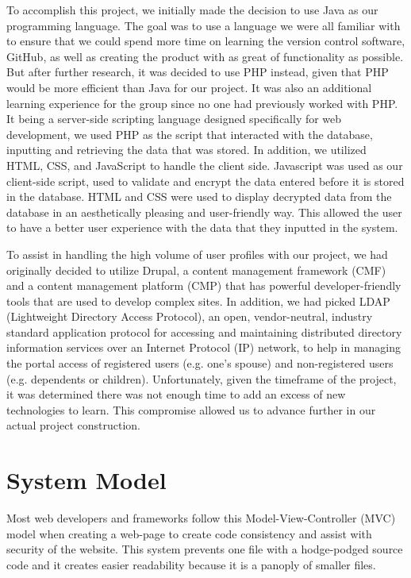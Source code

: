 \documentclass[twocolumn,12pt]{article}
\begin{document}
To accomplish this project, we initially made the decision to use Java as our programming language. The goal was to use a language we were all familiar with to ensure that we could spend more time on learning the version control software, GitHub, as well as creating the product with as great of functionality as possible. But after further research, it was decided to use PHP instead, given that PHP would be more efficient than Java for our project. It was also an additional learning experience for the group since no one had previously worked with PHP. It being a server-side scripting language designed specifically for web development, we used PHP as the script that interacted with the database, inputting and retrieving the data that was stored. In addition, we utilized HTML, CSS, and JavaScript to handle the client side. Javascript was used as our client-side script, used to validate and encrypt the data entered before it is stored in the database. HTML and CSS were used to display decrypted data from the database in an aesthetically pleasing and user-friendly way. This allowed the user to have a better user experience with the data that they inputted in the system.

To assist in handling the high volume of user profiles with our project, we had originally decided to utilize Drupal, a content management framework (CMF) and a content management platform (CMP) that has powerful developer-friendly tools that are used to develop complex sites. In addition, we had picked LDAP (Lightweight Directory Access Protocol), an open, vendor-neutral, industry standard application protocol for accessing and maintaining distributed directory information services over an Internet Protocol (IP) network, to help in managing the portal access of registered users (e.g. one's spouse) and non-registered users (e.g. dependents or children). Unfortunately, given the timeframe of the project, it was determined there was not enough time to add an excess of new technologies to learn. This compromise allowed us to advance further in our actual project construction.

\section{System Model}
Most web developers and frameworks follow this Model-View-Controller (MVC) model when creating a web-page to create code consistency and assist with security of the website.  This system prevents one file with a hodge-podged source code and it creates easier readability because it is a panoply of smaller files. 
\end{document}
